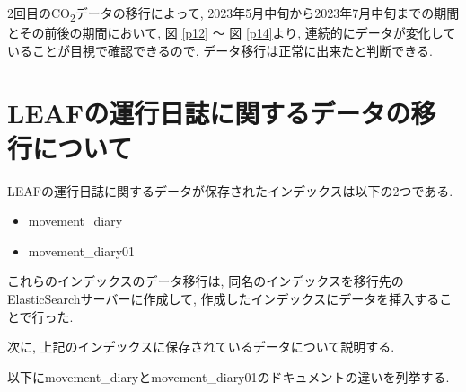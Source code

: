 2回目のCO\textsubscript{2}データの移行によって, 2023年5月中旬から2023年7月中旬までの期間とその前後の期間において, 図 \ref{p12} 〜 図 \ref{p14}より, 連続的にデータが変化していることが目視で確認できるので, データ移行は正常に出来たと判断できる.

\section{LEAFの運行日誌に関するデータの移行について}

LEAFの運行日誌に関するデータが保存されたインデックスは以下の2つである.

\begin{itemize}
    \item movement\_diary
    \item movement\_diary01
\end{itemize}

これらのインデックスのデータ移行は, 同名のインデックスを移行先のElasticSearchサーバーに作成して, 作成したインデックスにデータを挿入することで行った.

次に, 上記のインデックスに保存されているデータについて説明する.

以下にmovement\_diaryとmovement\_diary01のドキュメントの違いを列挙する.

